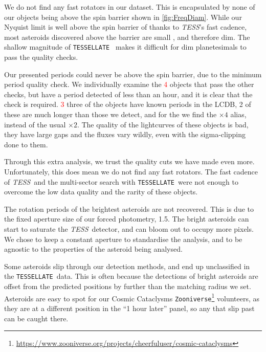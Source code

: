 \documentclass[12pt]{article}
\newcommand{\ttt}{\texttt}
\newcommand{\tess}{\textit{TESS}}
\newcommand{\tessellate}{\texttt{TESSELLATE}}
\newcommand{\red}[1]{\textcolor{red}{#1}}
\begin{document}
We do not find any fast rotators in our dataset.
This is encapsulated by none of our objects being above the spin barrier shown in \autoref{fig:FreqDiam}.
While our Nyquist limit is well above the spin barrier of \citet{Pravec2000} thanks to \tess's fast cadence, most asteroids discovered above the barrier are small%
, and therefore dim.
The shallow magnitude of \tessellate\  makes it difficult for dim planetesimals to pass the quality checks.

Our presented periods could never be above the spin barrier, due to the minimum period quality check. 
We individually examine the \red{4} objects that pass the other checks, but have a period detected of less than an hour, and it is clear that the check is required.
\red{3} three of the objects have known periods in the LCDB, 2 of these are much longer than those we detect, and for the \red{} we find the $\times 4$ alias, instead of the usual $\times 2$.
The quality of the lightcurves of these objects is bad, they have large gaps and the fluxes vary wildly, even with the sigma-clipping done to them.

Through this extra analysis, we trust the quality cuts we have made even more. 
Unfortunately, this does mean we do not find any fast rotators.
The fast cadence of \tess\ and the multi-sector search with \tessellate\ were not enough to overcome the low data quality and the rarity of these objects.   


The rotation periods of the brightest asteroids are not recovered.
This is due to the fixed aperture size of our forced photometry, \qty{1.5}{\px}.
The bright asteroids can start to saturate the \tess\ detector, and can bloom out to occupy more pixels.
We chose to keep a constant aperture to standardise the analysis, and to be agnostic to the properties of the asteroid being analysed.

Some asteroids slip through our detection methods, and end up unclassified in the \tessellate\ data.
This is often because the detections of bright asteroids are offset from the predicted positions by further than the matching radius we set.
Asteroids are easy to spot for our Cosmic Cataclysms \ttt{Zooniverse}\footnote{\url{https://www.zooniverse.org/projects/cheerfuluser/cosmic-cataclysms}} volunteers, as they are at a different position in the ``1 hour later'' panel, so any that slip past can be caught there.
\end{document}
